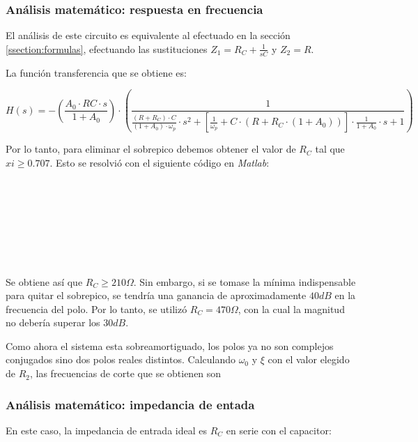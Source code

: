 \documentclass[../../main.tex]{subfiles}
\begin{document}
\subsubsection{An\'alisis matem\'atico: respuesta en frecuencia}
El an\'alisis de este circuito es equivalente al efectuado en la secci\'on \ref{ssection:formulas}, efectuando las sustituciones  $Z_1=R_C+\frac{1}{sC}$ y $Z_2 = R$. 

La funci\'on transferencia que se obtiene es:

\begin{equation} H(s) = -\left(\frac{A_0 \cdot RC \cdot s}{1+A_0}\right) \cdot
\left(\frac{1}{ \frac{(R+R_C)\cdot C}{(1+A_0)\cdot \omega_p} \cdot s^2 + [\frac{1}{\omega_p}+ C\cdot(R+R_C\cdot(1+A_0))]\cdot \frac{1}{1+A_0} \cdot s + 1 }\right)\end{equation}

Por lo tanto, para eliminar el sobrepico debemos obtener el valor de $R_C$ tal que $xi\geq 0.707$. Esto se resolvi\'o con el siguiente c\'odigo en \textit{Matlab}:\\
\newline
{}\\
\\
\\
\\
\\
\\
\\

Se obtiene as\'i que $R_C \geq 210\Omega$. Sin embargo, si se tomase la m\'inima indispensable para quitar el sobrepico, se tendr\'ia una ganancia de aproximadamente $40dB$ en la frecuencia del polo. Por lo tanto, se utiliz\'o $R_C = 470\Omega$, con la cual la magnitud no deber\'ia superar los $30dB$. \par

Como ahora el sistema esta sobreamortiguado, los polos ya no son complejos conjugados sino dos polos reales distintos. Calculando $\omega_0$ y $\xi$ con el valor elegido de $R_2$, las frecuencias de corte que se obtienen son 

\subsubsection{An\'alisis matem\'atico: impedancia de entada}
En este caso, la impedancia de entrada ideal es $R_C$ en serie con el capacitor:
\end{document}
